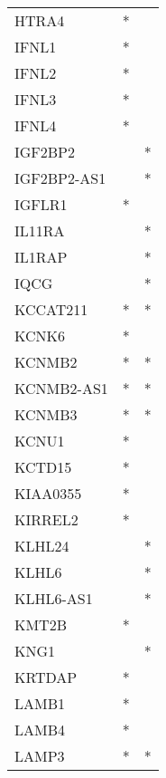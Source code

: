 \begin{longtable}{lcc}
HTRA4            &              * &            \\
IFNL1            &              * &            \\
IFNL2            &              * &            \\
IFNL3            &              * &            \\
IFNL4            &              * &            \\
IGF2BP2          &                &          * \\
IGF2BP2-AS1      &                &          * \\
IGFLR1           &              * &            \\
IL11RA           &                &          * \\
IL1RAP           &                &          * \\
IQCG             &                &          * \\
KCCAT211         &              * &          * \\
KCNK6            &              * &            \\
KCNMB2           &              * &          * \\
KCNMB2-AS1       &              * &          * \\
KCNMB3           &              * &          * \\
KCNU1            &              * &            \\
KCTD15           &              * &            \\
KIAA0355         &              * &            \\
KIRREL2          &              * &            \\
KLHL24           &                &          * \\
KLHL6            &                &          * \\
KLHL6-AS1        &                &          * \\
KMT2B            &              * &            \\
KNG1             &                &          * \\
KRTDAP           &              * &            \\
LAMB1            &              * &            \\
LAMB4            &              * &            \\
LAMP3            &              * &          * \\

\end{longtable}
